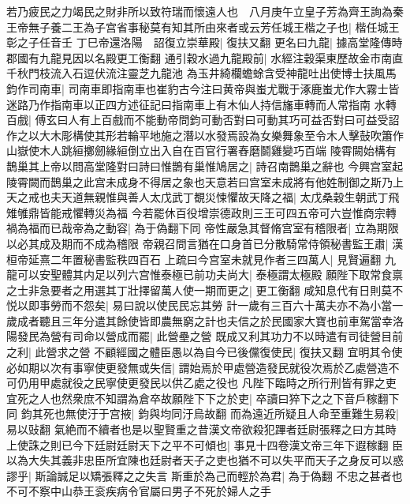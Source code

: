 若乃疲民之力竭民之財非所以致符瑞而懷遠人也　八月庚午立皇子芳為齊王詢為秦王帝無子養二王為子宫省事秘莫有知其所由來者或云芳任城王楷之子也|{
	楷任城王彰之子任音壬}
丁巳帝還洛陽　詔復立崇華殿|{
	復扶又翻}
更名曰九龍|{
	據高堂隆傳時郡國有九龍見因以名殿更工衡翻}
通引穀水過九龍殿前|{
	水經注穀渠東歷故金市南直千秋門枝流入石逗伏流注靈芝九龍池}
為玉井綺欄蟾蜍含受神龍吐出使博士扶風馬鈞作司南車|{
	司南車即指南車也崔豹古今注曰黄帝與蚩尤戰于涿鹿蚩尤作大霧士皆迷路乃作指南車以正四方述征記曰指南車上有木仙人持信旛車轉而人常指南}
水轉百戲|{
	傅玄曰人有上百戲而不能動帝問鈞可動否對曰可動其巧可益否對曰可益受詔作之以大木彫構使其形若輪平地施之潛以水發焉設為女樂舞象至令木人擊鼔吹簫作山嶽使木人跳絙擲劒緣絙倒立出入自在百官行署舂磨鬬雞變巧百端}
陵霄闕始構有鵲巢其上帝以問高堂隆對曰詩曰惟鵲有巢惟鳩居之|{
	詩召南鵲巢之辭也}
今興宫室起陵霄闕而鵲巢之此宫未成身不得居之象也天意若曰宫室未成將有他姓制御之斯乃上天之戒也夫天道無親惟與善人太戊武丁覩災悚懼故天降之福|{
	太戊桑榖生朝武丁飛雉雊鼎皆能戒懼轉災為福}
今若罷休百役增崇德政則三王可四五帝可六豈惟商宗轉禍為福而已哉帝為之動容|{
	為于偽翻下同}
帝性嚴急其督脩宫室有稽限者|{
	立為期限以必其成及期而不成為稽限}
帝親召問言猶在口身首已分散騎常侍領秘書監王肅|{
	漢桓帝延熹二年置秘書監秩四百石}
上疏曰今宫室未就見作者三四萬人|{
	見賢遍翻}
九龍可以安聖體其内足以列六宫惟泰極已前功夫尚大|{
	泰極謂太極殿}
願陛下取常食禀之士非急要者之用選其丁壯擇留萬人使一期而更之|{
	更工衡翻}
咸知息代有日則莫不悦以即事勞而不怨矣|{
	易曰說以使民民忘其勞}
計一歲有三百六十萬夫亦不為小當一歲成者聽且三年分遣其餘使皆即農無窮之計也夫信之於民國家大寶也前車駕當幸洛陽發民為營有司命以營成而罷|{
	此營壘之營}
既成又利其功力不以時遣有司徒營目前之利|{
	此營求之營}
不顧經國之體臣愚以為自今已後儻復使民|{
	復扶又翻}
宜明其令使必如期以次有事寧使更發無或失信|{
	謂始焉於甲處營造發民就役次焉於乙處營造不可仍用甲處就役之民寧使更發民以供乙處之役也}
凡陛下臨時之所行刑皆有罪之吏宜死之人也然衆庶不知謂為倉卒故願陛下下之於吏|{
	卒讀曰猝下之之下音戶稼翻下同}
鈞其死也無使汙于宫掖|{
	鈞與均同汙烏故翻}
而為遠近所疑且人命至重難生易殺|{
	易以䜴翻}
氣絶而不續者也是以聖賢重之昔漢文帝欲殺犯蹕者廷尉張釋之曰方其時上使誅之則已今下廷尉廷尉天下之平不可傾也|{
	事見十四卷漢文帝三年下遐稼翻}
臣以為大失其義非忠臣所宜陳也廷尉者天子之吏也猶不可以失平而天子之身反可以惑謬乎|{
	斯論誠足以矯張釋之之失言}
斯重於為己而輕於為君|{
	為于偽翻}
不忠之甚者也不可不察中山恭王衮疾病令官屬曰男子不死於婦人之手

